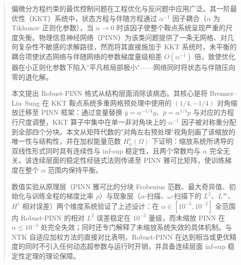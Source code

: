 \documentclass{xmu}
\theoremstyle{plain}
\theoremstyle{remark}
\begin{document}
\begin{abstract}
偏微分方程约束的最优控制问题在工程优化与反问题中应用广泛。其一阶最优性（KKT）系统中，状态方程与伴随方程通过 $\alpha^{-1}$ 因子耦合（$\alpha$ 为 Tikhonov 正则化参数），当 $\alpha\to 0$ 时该因子使整个鞍点系统呈现严重的尺度失衡。物理信息神经网络（PINN）为该类问题提供了一条无网格、对几何复杂性不敏感的求解路径，然而将其直接施加于 KKT 系统时，未平衡的耦合项使状态网络与伴随网络的参数梯度量级相差 $O(\alpha^{-1})$ 倍，致使优化器在小正则化参数下陷入"平凡核局部极小"——网络同时将状态与伴随压向零的退化解。

本文提出 Robust-PINN 格式从结构层面消除该病态。其核心是将 Brenner--Liu--Sung 在 KKT 鞍点系统多重网格预处理中使用的 $(1/4,-1/4)$ 对角缩放迁移至 PINN 框架：通过变量替换 $\bar y=\alpha^{-1/4}y$、$\bar p=\alpha^{1/4}p$ 与对应的方程行尺度调整，KKT 算子中集中在单一非对角块上的 $\alpha^{-1}$ 因子被对称重分配到全部四个分块。本文从矩阵代数的"对角左右预处理"视角刻画了该缩放的唯一性与结构性，并在加权能量范数 $H_\alpha^1(\Omega)$ 下证明：缩放系统所诱导的双线性形式同时具有连续性与 inf-sup 稳定性，且两个常数均与 $\alpha$ 完全无关。该连续层面的稳定性经链式法则传递至 PINN 雅可比矩阵，使训练梯度在整个 $\alpha$ 范围内保持平衡。

数值实验从原理层（PINN 雅可比的分块 Frobenius 范数、最大奇异值、初始化与训练全程的梯度比率 $\rho$）与现象层（$\alpha$-扫描、$\omega$-扫描下的 $L^2$、$L^\infty$、$H^1$ 相对误差）两个维度系统验证了上述设计：在 $\alpha\in[10^{-5},10^{-2}]$ 全范围内 Robust-PINN 的相对 $L^2$ 误差稳定在 $10^{-3}$ 量级，而未缩放 PINN 在 $\alpha\le 10^{-4}$ 处完全失效；同时还专门解释了未缩放系统失效的具体机制。与 NTK 自适应加权方法的直接对比表明，Robust-PINN 在达到相当或更优精度的同时不引入任何动态超参数与运行时开销，并具备连续层面 inf-sup 稳定性定理的理论保障。
\end{abstract}
\end{document}
